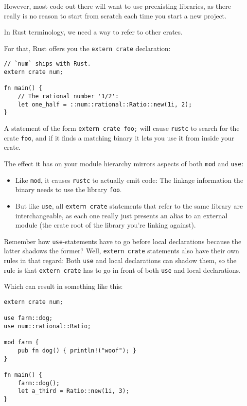 \documentclass[]{article}
\begin{document}
However, most code out there will want to use preexisting libraries, as
there really is no reason to start from scratch each time you start a
new project.

In Rust terminology, we need a way to refer to other crates.

For that, Rust offers you the \texttt{extern crate} declaration:

\begin{verbatim}
// `num` ships with Rust.
extern crate num;

fn main() {
    // The rational number '1/2':
    let one_half = ::num::rational::Ratio::new(1i, 2);
}
\end{verbatim}

A statement of the form \texttt{extern crate foo;} will cause
\texttt{rustc} to search for the crate \texttt{foo}, and if it finds a
matching binary it lets you use it from inside your crate.

The effect it has on your module hierarchy mirrors aspects of both
\texttt{mod} and \texttt{use}:

\begin{itemize}
\item
  Like \texttt{mod}, it causes \texttt{rustc} to actually emit code: The
  linkage information the binary needs to use the library \texttt{foo}.
\item
  But like \texttt{use}, all \texttt{extern crate} statements that refer
  to the same library are interchangeable, as each one really just
  presents an alias to an external module (the crate root of the library
  you're linking against).
\end{itemize}

Remember how \texttt{use}-statements have to go before local
declarations because the latter shadows the former? Well,
\texttt{extern crate} statements also have their own rules in that
regard: Both \texttt{use} and local declarations can shadow them, so the
rule is that \texttt{extern crate} has to go in front of both
\texttt{use} and local declarations.

Which can result in something like this:

\begin{verbatim}
extern crate num;

use farm::dog;
use num::rational::Ratio;

mod farm {
    pub fn dog() { println!("woof"); }
}

fn main() {
    farm::dog();
    let a_third = Ratio::new(1i, 3);
}
\end{verbatim}
\end{document}
